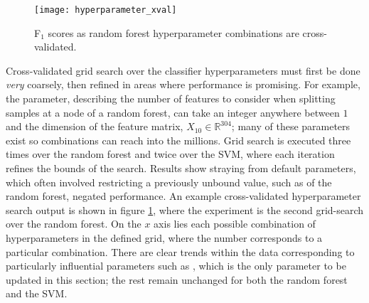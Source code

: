             \begin{figure}[ht]
                \centering
                \texttt{[image: hyperparameter\_xval]}
                \caption{F$_{1}$ scores as random forest hyperparameter combinations are cross-validated.}
                \label{fig:exp-clf-opt-hyp}
            \end{figure}
            
            Cross-validated grid search over the classifier hyperparameters must first be done \textit{very} coarsely, then refined in areas where performance is promising. For example, the  parameter, describing the number of features to consider when splitting samples at a node of a random forest, can take an integer anywhere between $1$ and the dimension of the feature matrix, $X_{10} \in \mathbb{R}^{304}$; many of these parameters exist so combinations can reach into the millions. Grid search is executed three times over the random forest and twice over the SVM, where each iteration refines the bounds of the search. Results show straying from default parameters, which often involved restricting a previously unbound value, such as  of the random forest, negated performance. An example cross-validated hyperparameter search output is shown in figure \ref{fig:exp-clf-opt-hyp}, where the experiment is the second grid-search over the random forest. On the $x$ axis lies each possible combination of hyperparameters in the defined grid, where the number corresponds to a particular combination. There are clear trends within the data corresponding to particularly influential parameters such as , which is the only parameter to be updated in this section; the rest remain unchanged for both the random forest and the SVM. 
            
            
            
            
